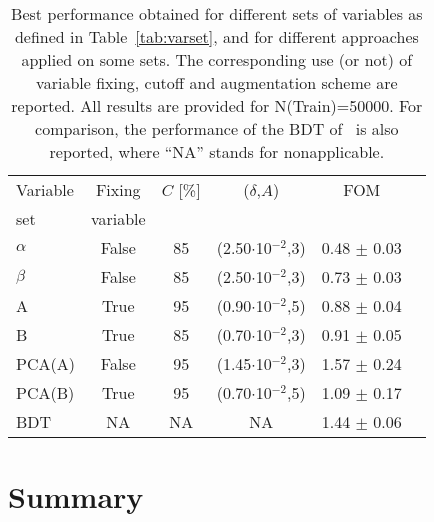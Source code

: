 \documentclass{article}
\begin{document}
\begin{table}[!htbp]
\begin{center}  
\begin{tabular}{|l|c|c|c|c|c|}
\hline
\hline
Variable  & Fixing   & $C$ [\%] & ($\delta$,$A$) & FOM \\
  set     & variable &          &                &     \\
\hline
 $\alpha$ & False & 85 & (2.50$\cdot$10$^{-2}$,3) &  0.48 $\pm$ 0.03 \\
 $\beta$  & False & 85 & (2.50$\cdot$10$^{-2}$,3) &  0.73 $\pm$ 0.03 \\
 A        & True  & 95 & (0.90$\cdot$10$^{-2}$,5) &  0.88 $\pm$ 0.04 \\
 B        & True  & 85 & (0.70$\cdot$10$^{-2}$,3) &  0.91 $\pm$ 0.05 \\
 PCA(A)   & False & 95 & (1.45$\cdot$10$^{-2}$,3) &  1.57 $\pm$ 0.24 \\
 PCA(B)   & True  & 95 & (0.70$\cdot$10$^{-2}$,5) &  1.09 $\pm$ 0.17 \\
\hline
 BDT      & NA    & NA & NA        &  1.44 $\pm$ 0.06 \\
\hline
\hline
\end{tabular}
\caption{Best performance obtained for different sets of variables as defined
  in Table~\ref{tab:varset}, and for different approaches applied on some sets.
  The corresponding use (or not) of variable fixing, cutoff and augmentation
  scheme are reported. All results are provided for N(Train)=50000. For
  comparison, the performance of the BDT of~\cite{st4bd} is also reported,
  where ``NA'' stands for nonapplicable.}
\label{tab:fomAll}
\end{center}
\end{table}

\section{Summary}
\label{s:conc}
\end{document}
